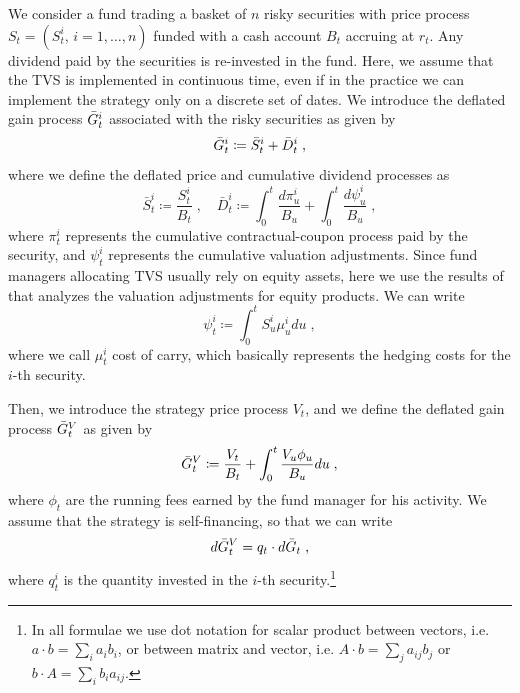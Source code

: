 \documentclass[11pt]{article}
\begin{document}
We consider a fund trading a basket of $n$ risky securities with price process $S_t = (S_t^i, \, i=1,\dots,n)$ funded with a cash account $B_t$ accruing at $r_t$. Any dividend paid by the securities is re-invested in the fund. Here, we assume that the TVS is implemented in continuous time, even if in the practice we can implement the strategy only on a discrete set of dates. We introduce the deflated gain process $\Bar{G}_t^i$ associated with the risky securities as given by
\begin{equation}
    \Bar{G}_t^i \coloneqq \Bar{S}_t^i + \Bar{D}_t^i \; ,
\end{equation}
where we define the deflated price and cumulative dividend processes as 
\begin{equation}
    \bar{S}_t^i \coloneqq \frac{S_t^i}{B_t} \; , \quad \bar{D}^i_t \coloneqq \int_0^t\frac{d\pi_u^i}{B_u} + \int_0^t\frac{d\psi_u^i}{B_u} \; ,
\end{equation}
where $\pi^i_t$ represents the cumulative contractual-coupon process paid by the security, and $\psi_t^i$ represents the cumulative valuation adjustments.
Since fund managers allocating TVS usually rely on equity assets, here we use the results of \textcite{Gabrielli2020} that analyzes the valuation adjustments for equity products. We can write 
\begin{equation}
    \psi_t^i \coloneqq \int_0^t S_u^i\mu_u^i du \; ,
\label{eq:XVA_equity}\end{equation}
where we call $\mu_t^i$ cost of carry, which basically represents the hedging costs for the $i$-th security.

Then, we introduce the strategy price process $V_t$, and we define the deflated gain process $\Bar{G}_t^V$ as given by
\begin{equation}
    \Bar{G}_t^V \coloneqq \frac{V_t}{B_t} + \int_0^t\frac{V_u\phi_u}{B_u}du \; ,
\end{equation}
where $\phi_t$ are the running fees earned by the fund manager for his activity. We assume that the strategy is self-financing, so that we can write
\begin{equation}
    d\Bar{G}_t^V = q_t \cdot d\bar{G}_t \; ,
\label{eq:self_financing}\end{equation}
where $q_t^i$ is the quantity invested in the $i$-th security.\footnote{In all formulae we use dot notation for scalar product between vectors, i.e. $a \cdot b = \sum_i a_i b_i$, or between matrix and vector, i.e. $A \cdot b = \sum_j a_{ij}b_j$ or $b \cdot A = \sum_i b_i a_{ij}$.}
\end{document}
